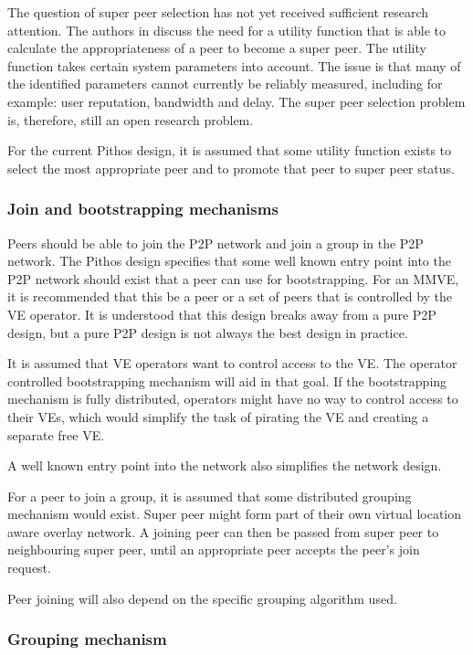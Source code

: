 The question of super peer selection has not yet received sufficient research attention. The authors in \cite{Suesselbeck_super_peer_selection} discuss the need for a utility function that is able to calculate the appropriateness of a peer to become a super peer. The utility function takes certain system parameters into account. The issue is that many of the identified parameters cannot currently be reliably measured, including for example: user reputation, bandwidth and delay. The super peer selection problem is, therefore, still an open research problem.

For the current Pithos design, it is assumed that some utility function exists to select the most appropriate peer and to promote that peer to super peer status.

\subsubsection{Join and bootstrapping mechanisms}
\label{join_mechanism_design}

Peers should be able to join the P2P network and join a group in the P2P network. The Pithos design specifies that some well known entry point into the P2P network should exist that a peer can use for bootstrapping. For an MMVE, it is recommended that this be a peer or a set of peers that is controlled by the VE operator. It is understood that this design breaks away from a pure P2P design, but a pure P2P design is not always the best design in practice.

It is assumed that VE operators want to control access to the VE. The operator controlled bootstrapping mechanism will aid in that goal. If the bootstrapping mechanism is fully distributed, operators might have no way to control access to their VEs, which would simplify the task of pirating the VE and creating a separate free VE.

A well known entry point into the network also simplifies the network design.

For a peer to join a group, it is assumed that some distributed grouping mechanism would exist. Super peer might form part of their own virtual location aware overlay network. A joining peer can then be passed from super peer to neighbouring super peer, until an appropriate peer accepts the peer's join request.

Peer joining will also depend on the specific grouping algorithm used.

\subsubsection{Grouping mechanism}
\label{grouping_design}

